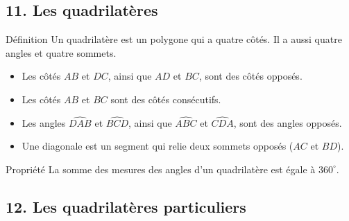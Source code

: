 \newpage
\subsection*{11. Les quadrilatères}

\begin{regle}{Définition}
Un \textcolor{themeColor}{quadrilatère} est un \textcolor{themeColor}{polygone} qui a quatre côtés. Il a aussi quatre angles et quatre sommets.
\end{regle}

\begin{center}
\end{center}

\begin{itemize}[leftmargin=*, itemsep=2pt, topsep=2pt, label=$\triangleright$]
    \item Les côtés $AB$ et $DC$, ainsi que $AD$ et $BC$, sont des \textcolor{themeColor}{côtés opposés}.
    \item Les côtés $AB$ et $BC$ sont des \textcolor{themeColor}{côtés consécutifs}.
    \item Les angles $\widehat{DAB}$ et $\widehat{BCD}$, ainsi que $\widehat{ABC}$ et $\widehat{CDA}$, sont des \textcolor{themeColor}{angles opposés}.
    \item Une \textcolor{themeColor}{diagonale} est un segment qui relie deux sommets opposés ($AC$ et $BD$).
\end{itemize}

\begin{regle}{Propriété}
La somme des mesures des angles d'un quadrilatère est égale à \textcolor{themeColor}{$360^\circ$}.
\end{regle}

\vfill
\subsection*{12. Les quadrilatères particuliers}

